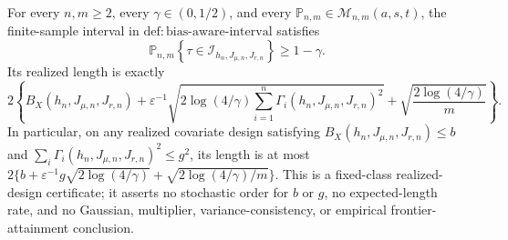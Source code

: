 For every \(n,m\ge2\), every \(\gamma\in(0,1/2)\), and every \(\mathbb P_{n,m}\in\mathcal M_{n,m}(a,s,t)\), the finite-sample interval in \(\mathrm{def:bias\text{-}aware\text{-}interval}\) satisfies
\[
\mathbb P_{n,m}\left\{\tau\in\mathcal I_{h_n,J_{\mu,n},J_{r,n}}\right\}\ge1-\gamma.
\]
Its realized length is exactly
\[
2\left\{
B_X(h_n,J_{\mu,n},J_{r,n})
+\varepsilon^{-1}\sqrt{2\log(4/\gamma)\sum_{i=1}^n\Gamma_i(h_n,J_{\mu,n},J_{r,n})^2}
+\sqrt{\frac{2\log(4/\gamma)}m}
\right\}.
\]
In particular, on any realized covariate design satisfying \(B_X(h_n,J_{\mu,n},J_{r,n})\le b\) and \(\sum_i\Gamma_i(h_n,J_{\mu,n},J_{r,n})^2\le g^2\), its length is at most \(2\{b+\varepsilon^{-1}g\sqrt{2\log(4/\gamma)}+\sqrt{2\log(4/\gamma)/m}\}\). This is a fixed-class realized-design certificate; it asserts no stochastic order for \(b\) or \(g\), no expected-length rate, and no Gaussian, multiplier, variance-consistency, or empirical frontier-attainment conclusion.